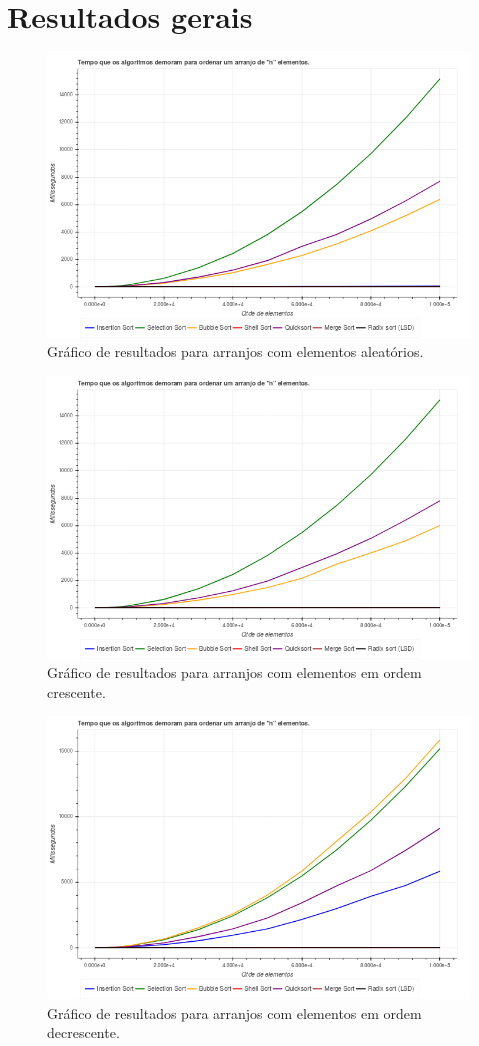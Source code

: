 \section{Resultados gerais}


\begin{figure}[H]
	\centering
	\includegraphics[scale=0.6]{img/graficos/aleatorios.png}
	\caption{Gráfico de resultados para arranjos com elementos aleatórios.}
	\label{graph-aleatorios}
\end{figure}

\begin{figure}[H]
	\centering
	\includegraphics[scale=0.6]{img/graficos/crescentes.png}
	\caption{Gráfico de resultados para arranjos com elementos em ordem crescente.}
	\label{graph-crescentes}
\end{figure}

\begin{figure}[H]
	\centering
	\includegraphics[scale=0.6]{img/graficos/decrescentes.png}
	\caption{Gráfico de resultados para arranjos com elementos em ordem decrescente.}
	\label{graph-decrescentes}
\end{figure}